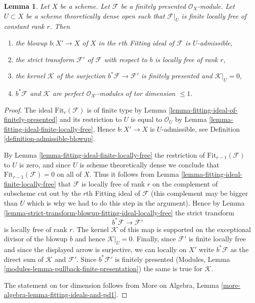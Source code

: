 \documentclass[10pt,a4paper]{amsart}
\theoremstyle{plain}
\newtheorem{lemma}[subsection]{Lemma}
\theoremstyle{definition}
\theoremstyle{remark}
\numberwithin{equation}{subsection}
\begin{document}
\begin{lemma}
\label{lemma-blowup-fitting-ideal}
Let $X$ be a scheme. Let $\mathcal{F}$ be a finitely presented
$\mathcal{O}_X$-module. Let $U \subset X$ be a scheme theoretically
dense open such that $\mathcal{F}|_U$ is finite locally free of
constant rank $r$. Then
\begin{enumerate}
\item the blowup $b : X' \to X$ of $X$ in the $r$th Fitting
ideal of $\mathcal{F}$ is $U$-admissible,
\item the strict transform $\mathcal{F}'$ of $\mathcal{F}$
with respect to $b$ is locally free of rank $r$,
\item the kernel $\mathcal{K}$ of the surjection
$b^*\mathcal{F} \to \mathcal{F}'$ is
finitely presented and $\mathcal{K}|_U = 0$,
\item $b^*\mathcal{F}$ and $\mathcal{K}$ are perfect
$\mathcal{O}_{X'}$-modules of tor dimension $\leq 1$.
\end{enumerate}
\end{lemma}

\begin{proof}
The ideal $\text{Fit}_r(\mathcal{F})$ is of finite type
by Lemma \ref{lemma-fitting-ideal-of-finitely-presented}
and its restriction to $U$ is equal to $\mathcal{O}_U$ by
Lemma \ref{lemma-fitting-ideal-finite-locally-free}.
Hence $b : X' \to X$ is $U$-admissible, see
Definition \ref{definition-admissible-blowup}.

\medskip\noindent
By Lemma \ref{lemma-fitting-ideal-finite-locally-free}
the restriction of $\text{Fit}_{r - 1}(\mathcal{F})$
to $U$ is zero, and since $U$ is scheme theoretically dense
we conclude that $\text{Fit}_{r - 1}(\mathcal{F}) = 0$
on all of $X$. Thus it follows from
Lemma \ref{lemma-fitting-ideal-finite-locally-free}
that $\mathcal{F}$ is locally free of rank $r$
on the complement of subscheme cut out by the $r$th
Fitting ideal of $\mathcal{F}$ (this complement may
be bigger than $U$ which is why we had to do this step
in the argument). Hence by
Lemma \ref{lemma-strict-transform-blowup-fitting-ideal-locally-free}
the strict transform
$$
b^*\mathcal{F} \longrightarrow \mathcal{F}'
$$
is locally free of rank $r$. The kernel $\mathcal{K}$
of this map is supported on the exceptional divisor
of the blowup $b$ and hence $\mathcal{K}|_U = 0$.
Finally, since $\mathcal{F}'$ is finite locally free
and since the displayed arrow is surjective, we can
locally on $X'$ write $b^*\mathcal{F}$ as the
direct sum of $\mathcal{K}$ and $\mathcal{F}'$.
Since $b^*\mathcal{F}'$ is finitely presented
(Modules, Lemma \ref{modules-lemma-pullback-finite-presentation})
the same is true for $\mathcal{K}$.

\medskip\noindent
The statement on tor dimension follows from
More on Algebra, Lemma \ref{more-algebra-lemma-fitting-ideals-and-pd1}.
\end{proof}
\end{document}
